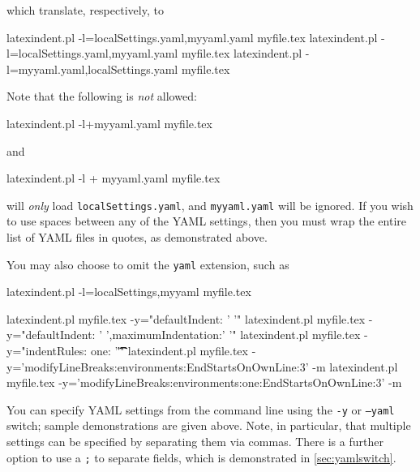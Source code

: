  which translate, respectively, to

 \begin{commandshell}
latexindent.pl -l=localSettings.yaml,myyaml.yaml myfile.tex
latexindent.pl -l=localSettings.yaml,myyaml.yaml myfile.tex
latexindent.pl -l=myyaml.yaml,localSettings.yaml myfile.tex
\end{commandshell}

 Note that the following is \emph{not} allowed:

 \begin{commandshell}
latexindent.pl -l+myyaml.yaml myfile.tex
\end{commandshell}

 and

 \begin{commandshell}
latexindent.pl -l + myyaml.yaml myfile.tex
\end{commandshell}

 will \emph{only} load \texttt{localSettings.yaml}, and \texttt{myyaml.yaml} will be
 ignored. If you wish to use spaces between any of the YAML settings, then you must wrap
 the entire list of YAML files in quotes, as demonstrated above.

 You may also choose to omit the \texttt{yaml} extension, such as

 \begin{commandshell}
latexindent.pl -l=localSettings,myyaml myfile.tex
\end{commandshell}


 \begin{commandshell}
latexindent.pl myfile.tex -y="defaultIndent: ' '"
latexindent.pl myfile.tex -y="defaultIndent: ' ',maximumIndentation:' '"
latexindent.pl myfile.tex -y="indentRules: one: '\t\t\t\t'"
latexindent.pl myfile.tex -y='modifyLineBreaks:environments:EndStartsOnOwnLine:3' -m
latexindent.pl myfile.tex -y='modifyLineBreaks:environments:one:EndStartsOnOwnLine:3' -m
\end{commandshell}

 \label{page:yamlswitch}You%
  can specify YAML settings from the command line
 using the \texttt{-y} or \texttt{--yaml} switch; sample demonstrations are given above.
 Note, in particular, that multiple settings can be specified by separating them via
 commas. There is a further option to use a \texttt{;} to separate fields, which is
 demonstrated in \vref{sec:yamlswitch}.

